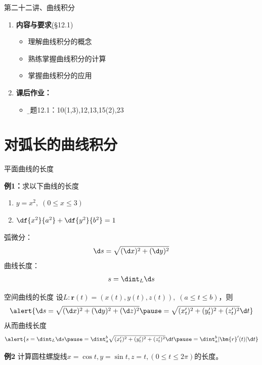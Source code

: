
\begin{frame}{第二十二讲、曲线积分}
	\linespread{1.5}
	\begin{enumerate}
	  \item {\bf 内容与要求}{\b (\S 12.1)}
	  \begin{itemize}
		\item 理解曲线积分的概念
		\item 熟练掌握曲线积分的计算
		\item 掌握曲线积分的应用
	  \vspace{1em}
	  \end{itemize}
	  \item {\bf  课后作业：}
	  \begin{itemize}
	    \item {\b 习题12.1：10(1,3),12,13,15(2),23}
	  \end{itemize}
	\end{enumerate}
\end{frame}

\section{对弧长的曲线积分}

\begin{frame}{平面曲线的长度}
	\linespread{1.2}\pause
	\begin{exampleblock}{{\bf 例1：}求以下曲线的长度\hfill}
		\begin{enumerate}
		  \item $y=x^2,\;(0\leq x\leq 3)$
		  \item $\df{x^2}{a^2}+\df{y^2}{b^2}=1$
		\end{enumerate}
	\end{exampleblock}
	\pause
	{\bb 弧微分：}
	$$\d s=\sqrt{(\d x)^2+(\d y)^2}$$
	\pause
	{\bb 曲线长度：}
	$$s=\dint_L\d s$$
\end{frame}

\begin{frame}{空间曲线的长度}
	\linespread{1.2}
	设$L:\bm{r}(t)=(x(t),y(t),z(t)),\;(a\leq t\leq b)$，\pause 则
	$$\alert{\d s=\sqrt{(\d x)^2+(\d y)^2+(\d z)^2}\pause
	=\sqrt{(x'_t)^2+(y'_t)^2+(z'_t)^2}\d t} $$
	\pause 从而曲线长度
	$$\alert{s=\dint_L\d s\pause =\dint_a^b\sqrt{(x'_t)^2+(y'_t)^2+(z'_t)^2}\d t
	\pause =\dint_a^b|\bm{r}'(t)|\d t}$$
	\pause 
	\begin{exampleblock}{{\bf 例2}\hfill}
		计算圆柱螺旋线$x=\cos t,y=\sin t,z=t,(0\leq t\leq 2\pi)$的长度。
	\end{exampleblock}
\end{frame}

